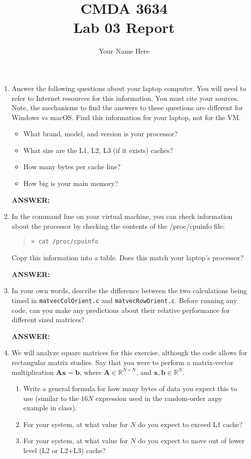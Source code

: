 \documentclass[letter]{article}
\title{CMDA 3634 \\ Lab 03 Report}
\author{Your Name Here}
\renewcommand{\vec}[1]{\ensuremath{\boldsymbol{#1}}} %
\newcommand{\cmd}[1]{\begin{quote}\texttt{> #1}\end{quote}}
\begin{document}
\maketitle

    \begin{enumerate}
        \item Answer the following questions about your laptop computer.  You will need to refer to Internet resources for this information.  You must cite your sources.  Note, the mechanisms to find the answers to these questions are different for Windows vs macOS.  Find this information for your laptop, not for the VM.
            \begin{itemize}
                \item What brand, model, and version is your processor?
                \item What size are the L1, L2, L3 (if it exists) caches?
                \item How many bytes per cache line? 
                \item How big is your main memory?
            \end{itemize}
        
        \textbf{ANSWER:} %


        \item In the command line on your virtual machine, you can check information about the processor by checking the contents of the /proc/cpuinfo file: \cmd{cat /proc/cpuinfo}
        Copy this information into a table. Does this match your laptop's 
        processor? 
        
        \textbf{ANSWER:} %
        
        \item In your own words, describe the difference between the two calculations being timed in \texttt{matvecColOrient.c} and \texttt{matvecRowOrient.c}. Before running any code, can you make any predictions about their relative performance for different sized matrices? 
        
        \textbf{ANSWER:} %
        
        \item We will analyze square matrices for this exercise, although the code allows for rectangular matrix studies. Say that you were to perform a matrix-vector multiplication $\vec{A}\vec{x} = \vec{b}$, where $\vec{A} \in \mathbb{R}^{N\times N}$, and $\vec{x}, \vec{b} \in \mathbb{R}^N$. 
            \begin{enumerate}
                \item Write a general formula for how many bytes of data you expect this to use (similar to the $16N$ expression used in the random-order axpy example in class).
                \item For your system, at what value for $N$ do you expect to exceed L1 cache? 
                \item For your system, at what value for $N$ do you expect to move out of lower level (L2 or L2+L3) cache? 
            \end{enumerate}
        

\end{enumerate}
\end{document}
